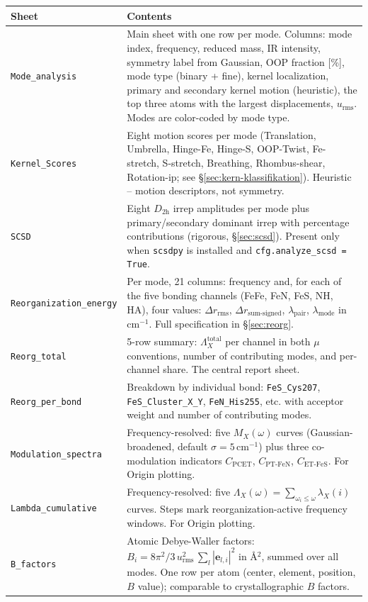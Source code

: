 \documentclass[11pt,a4paper,twoside]{article}
\newcommand{\evec}{\mathbf{e}}
\newcommand{\urms}{u_{\mathrm{rms}}}
\theoremstyle{remark}
\begin{document}
\begin{longtable}{p{} p{}}
\toprule
\textbf{Sheet} & \textbf{Contents} \\
\midrule
\endhead

\texttt{Mode\_analysis} & Main sheet with one row per mode.
  Columns: mode index, frequency, reduced mass, IR intensity,
  symmetry label from Gaussian, OOP fraction [\%], mode type
  (binary + fine), kernel localization, primary and secondary
  kernel motion (heuristic), the top three atoms with the largest
  displacements, $u_\text{rms}$. Modes are color-coded by mode
  type. \\

\texttt{Kernel\_Scores} & Eight motion scores per mode
  (Translation, Umbrella, Hinge-Fe, Hinge-S, OOP-Twist,
  Fe-stretch, S-stretch, Breathing, Rhombus-shear, Rotation-ip;
  see \S\ref{sec:kern-klassifikation}). Heuristic -- motion
  descriptors, not symmetry. \\

\texttt{SCSD} & Eight $D_\mathrm{2h}$ irrep amplitudes per mode
  plus primary/secondary dominant irrep with percentage
  contributions (rigorous, \S\ref{sec:scsd}). Present only when
  \texttt{scsdpy} is installed and
  \texttt{cfg.analyze\_scsd = True}. \\

\texttt{Reorganization\_energy} & Per mode, 21 columns: frequency
  and, for each of the five bonding channels (FeFe, FeN, FeS, NH,
  HA), four values: $\Delta r_\text{rms}$,
  $\Delta r_\text{sum-signed}$, $\lambda_\text{pair}$,
  $\lambda_\text{mode}$ in cm$^{-1}$.
  Full specification in \S\ref{sec:reorg}. \\

\texttt{Reorg\_total} & 5-row summary:
  $\Lambda_X^\text{total}$ per channel in both $\mu$ conventions,
  number of contributing modes, and per-channel share. The
  central report sheet. \\

\texttt{Reorg\_per\_bond} & Breakdown by individual bond:
  \texttt{FeS\_Cys207}, \texttt{FeS\_Cluster\_X\_Y},
  \texttt{FeN\_His255}, etc. with acceptor weight and number of
  contributing modes. \\

\texttt{Modulation\_spectra} & Frequency-resolved: five
  $M_X(\omega)$ curves (Gaussian-broadened, default
  $\sigma = 5$\,cm$^{-1}$) plus three co-modulation indicators
  $C_\text{PCET}$, $C_\text{PT-FeN}$, $C_\text{ET-FeS}$. For
  Origin plotting. \\

\texttt{Lambda\_cumulative} & Frequency-resolved: five
  $\Lambda_X(\omega) = \sum_{\omega_i \le \omega} \lambda_X(i)$
  curves. Steps mark reorganization-active frequency windows.
  For Origin plotting. \\

\texttt{B\_factors} & Atomic Debye-Waller factors:
  $B_i = 8\pi^2/3 \, \urms^2 \, \sum_l |\evec_{l,i}|^2$ in
  \AA{}$^2$, summed over all modes. One row per atom (center,
  element, position, $B$ value); comparable to crystallographic
  $B$ factors. \\
\bottomrule
\end{longtable}
\end{document}
